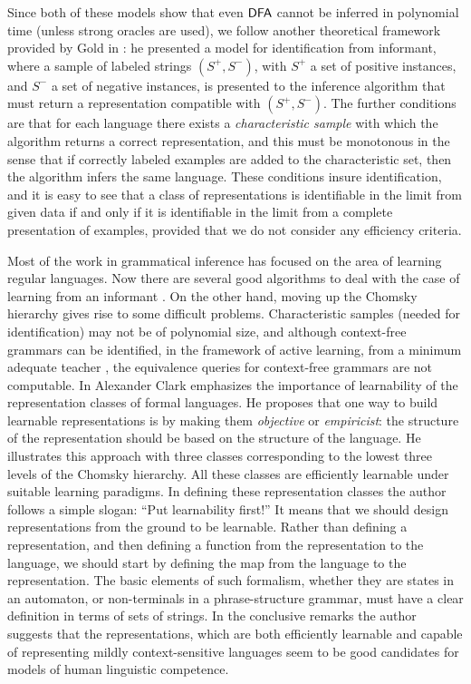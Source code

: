 Since both of these models show that even $\textup{\sf DFA}$ cannot be inferred in polynomial time (unless strong oracles are used), we follow another theoretical framework provided by Gold in \cite{Gold78}: he presented a model for identification from informant, where a sample of labeled strings $(S^+, S^-)$, with $S^+$ a set of positive instances, and $S^-$ a set of negative instances, is presented to the inference algorithm that must return a representation compatible with $(S^+, S^-)$. The further conditions are that for each language there exists a \emph{characteristic sample} with which the algorithm returns a correct representation, and this must be monotonous in the sense that if correctly labeled examples are added to the characteristic set, then the algorithm infers the same language. These conditions insure identification, and it is easy to see that a class of representations is identifiable in the limit from given data if and only if it is identifiable in the limit from a complete presentation of examples, provided that we do not consider any efficiency criteria.

Most of the work in grammatical inference has focused on the area of learning regular languages. Now there are several good algorithms to deal with the case of learning from an informant \cite{Cicchello2003}. On the other hand, moving up the Chomsky hierarchy gives rise to some difficult problems. Characteristic samples (needed for identification) may not be of polynomial size, and although context-free grammars can be identified, in the framework of active learning, from a minimum adequate teacher \cite{Angluin1987}, the equivalence queries for context-free grammars are not computable. In \cite{Clark2010} Alexander Clark emphasizes the importance of learnability of the representation classes of formal languages. He proposes that one way to build learnable representations is by making them \emph{objective} or \emph{empiricist}: the structure of the representation should be based on the structure of the language. He illustrates this approach with three classes corresponding to the lowest three levels of the Chomsky hierarchy. All these classes are efficiently learnable under suitable learning paradigms. In defining these representation classes the author follows a simple slogan: ``Put learnability first!'' It means that we should design representations from the ground to be learnable. Rather than defining a representation, and then defining a function from the representation to the language, we should start by defining the map from the language to the representation. The basic elements of such formalism, whether they are states in an automaton, or non-terminals in a phrase-structure grammar, must have a clear definition in terms of sets of strings. In the conclusive remarks the author suggests that the  representations, which are both efficiently learnable and capable of representing mildly context-sensitive languages seem to be good candidates for models of human linguistic competence. 

